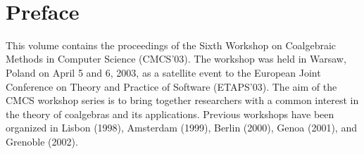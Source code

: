 \documentclass{article}
\newcommand{\linie}{\noindent {\rule{14cm}{1mm}}}
\begin{document}

\thispagestyle{empty} \vskip-2cm
\newpage


\ \
\newpage







 \tableofcontents

%
\newpage
\section*{Preface}
This volume contains the proceedings of the Sixth Workshop on
Coalgebraic Methods in Computer Science (CMCS'03). The workshop
was held in Warsaw, Poland on April 5 and 6, 2003, as a satellite
event to the European Joint Conference on Theory and Practice of
Software (ETAPS'03). The aim of the CMCS workshop series is to
bring together researchers with a common interest in the theory of
coalgebras and its applications. Previous workshops have been
organized in Lisbon (1998), Amsterdam (1999), Berlin (2000), Genoa
(2001), and Grenoble (2002).
\end{document}
